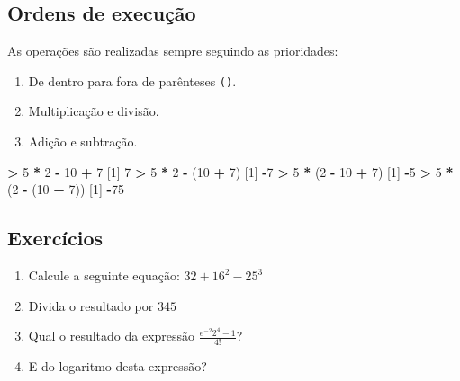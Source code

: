 \documentclass[10pt,a4paper]{book}
\newenvironment{Shaded}{\begin{snugshade}}{\end{snugshade}}
\newcommand{\DecValTok}[1]{\textcolor[rgb]{0.00,0.00,0.81}{#1}}
\newcommand{\StringTok}[1]{\textcolor[rgb]{0.31,0.60,0.02}{#1}}
\newcommand{\OperatorTok}[1]{\textcolor[rgb]{0.81,0.36,0.00}{\textbf{#1}}}
\newcommand{\NormalTok}[1]{#1}
\providecommand{\tightlist}{%
  \setlength{\itemsep}{0pt}\setlength{\parskip}{0pt}}
\begin{document}
\subsection{Ordens de execução}\label{ordens-de-execuuxe7uxe3o}

As operações são realizadas sempre seguindo as prioridades:

\begin{enumerate}
\def\labelenumi{\arabic{enumi}.}
\tightlist
\item
  De dentro para fora de parênteses \texttt{()}.
\item
  Multiplicação e divisão.
\item
  Adição e subtração.
\end{enumerate}

\begin{Shaded}
\begin{Highlighting}[]
\OperatorTok{>}\StringTok{ }\DecValTok{5} \OperatorTok{*}\StringTok{ }\DecValTok{2} \OperatorTok{-}\StringTok{ }\DecValTok{10} \OperatorTok{+}\StringTok{ }\DecValTok{7}
\NormalTok{[}\DecValTok{1}\NormalTok{] }\DecValTok{7}
\OperatorTok{>}\StringTok{ }\DecValTok{5} \OperatorTok{*}\StringTok{ }\DecValTok{2} \OperatorTok{-}\StringTok{ }\NormalTok{(}\DecValTok{10} \OperatorTok{+}\StringTok{ }\DecValTok{7}\NormalTok{)}
\NormalTok{[}\DecValTok{1}\NormalTok{] }\OperatorTok{-}\DecValTok{7}
\OperatorTok{>}\StringTok{ }\DecValTok{5} \OperatorTok{*}\StringTok{ }\NormalTok{(}\DecValTok{2} \OperatorTok{-}\StringTok{ }\DecValTok{10} \OperatorTok{+}\StringTok{ }\DecValTok{7}\NormalTok{)}
\NormalTok{[}\DecValTok{1}\NormalTok{] }\OperatorTok{-}\DecValTok{5}
\OperatorTok{>}\StringTok{ }\DecValTok{5} \OperatorTok{*}\StringTok{ }\NormalTok{(}\DecValTok{2} \OperatorTok{-}\StringTok{ }\NormalTok{(}\DecValTok{10} \OperatorTok{+}\StringTok{ }\DecValTok{7}\NormalTok{))}
\NormalTok{[}\DecValTok{1}\NormalTok{] }\OperatorTok{-}\DecValTok{75}
\end{Highlighting}
\end{Shaded}

\subsection*{Exercícios}\label{exercuxedcios}


\begin{enumerate}
\def\labelenumi{\arabic{enumi}.}
\tightlist
\item
  Calcule a seguinte equação: \(32 + 16^2 - 25^3\)
\item
  Divida o resultado por \(345\)
\item
  Qual o resultado da expressão \(\frac{e^{-2} 2^{4} - 1}{4!}\)?
\item
  E do logaritmo desta expressão?
\end{enumerate}
\end{document}
